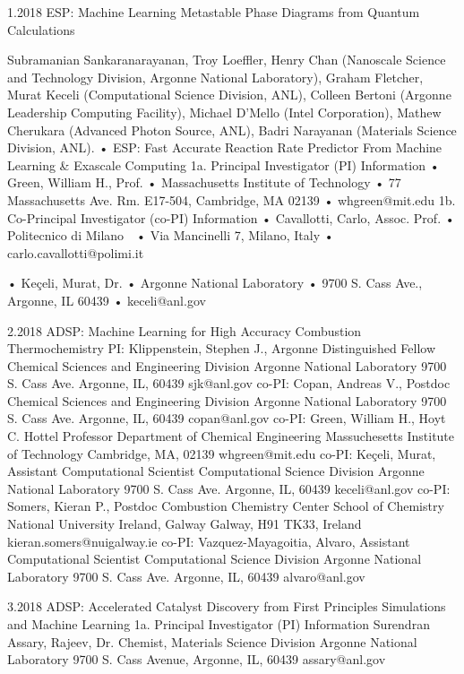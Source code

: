 1.2018 ESP: Machine Learning Metastable Phase Diagrams from Quantum Calculations

Subramanian Sankaranarayanan, Troy Loeffler, Henry Chan (Nanoscale Science and Technology Division, Argonne National Laboratory), Graham Fletcher, Murat Keceli (Computational Science Division, ANL), Colleen Bertoni (Argonne Leadership Computing Facility), Michael D’Mello (Intel Corporation), Mathew Cherukara (Advanced Photon Source, ANL), Badri Narayanan (Materials Science Division, ANL).
•	ESP: Fast Accurate Reaction Rate Predictor From Machine Learning & Exascale Computing
1a. Principal Investigator (PI) Information
•	Green, William H., Prof.
•	Massachusetts Institute of Technology
•	77 Massachusetts Ave. Rm. E17-504, Cambridge, MA 02139
•	whgreen@mit.edu
1b. Co-Principal Investigator (co-PI) Information
•	Cavallotti, Carlo, Assoc. Prof.
•	Politecnico di Milano  
•	Via Mancinelli 7, Milano, Italy 
•	carlo.cavallotti@polimi.it
 
•	Keçeli, Murat, Dr.
•	Argonne National Laboratory
•	9700 S. Cass Ave., Argonne, IL 60439
•	keceli@anl.gov

2.2018	ADSP: Machine Learning for High Accuracy Combustion Thermochemistry
PI: Klippenstein, Stephen J., Argonne Distinguished Fellow Chemical Sciences and Engineering Division
Argonne National Laboratory
9700 S. Cass Ave.
Argonne, IL, 60439
sjk@anl.gov
co-PI: Copan, Andreas V., Postdoc Chemical Sciences and Engineering Division Argonne National Laboratory
9700 S. Cass Ave.
Argonne, IL, 60439
copan@anl.gov
co-PI: Green, William H., Hoyt C. Hottel Professor Department of Chemical Engineering Massuchesetts Institute of Technology
Cambridge, MA, 02139
whgreen@mit.edu
co-PI: Keçeli, Murat, Assistant Computational Scientist Computational Science Division
Argonne National Laboratory
9700 S. Cass Ave.
Argonne, IL, 60439 keceli@anl.gov
co-PI: Somers, Kieran P., Postdoc Combustion Chemistry Center School of Chemistry
National University Ireland, Galway Galway, H91 TK33, Ireland kieran.somers@nuigalway.ie
co-PI: Vazquez-Mayagoitia, Alvaro, Assistant Computational Scientist Computational Science Division
Argonne National Laboratory
9700 S. Cass Ave.
Argonne, IL, 60439 alvaro@anl.gov

3.2018	ADSP: Accelerated Catalyst Discovery from First Principles Simulations and Machine Learning
1a. Principal Investigator (PI) Information
Surendran Assary, Rajeev, Dr.  
Chemist, Materials Science Division
Argonne National Laboratory 
9700 S. Cass Avenue, Argonne, IL, 60439
assary@anl.gov

